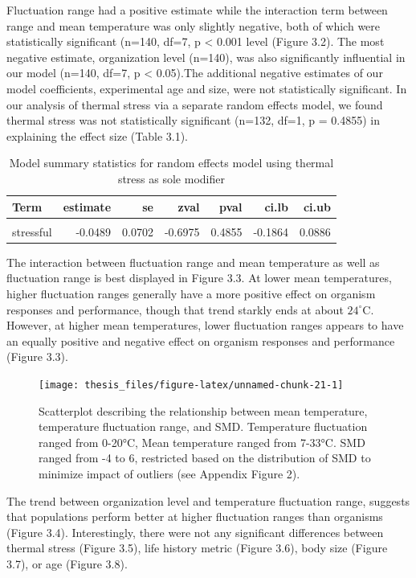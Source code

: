 \documentclass[12pt,twoside]{reedthesis}
\begin{document}
Fluctuation range had a positive estimate while the interaction term between range and mean temperature was only slightly negative, both of which were statistically significant (n=140, df=7, p \textless{} 0.001 level (Figure 3.2). The most negative estimate, organization level (n=140), was also significantly influential in our model (n=140, df=7, p \textless{} 0.05).The additional negative estimates of our model coefficients, experimental age and size, were not statistically significant. In our analysis of thermal stress via a separate random effects model, we found thermal stress was not statistically significant (n=132, df=1, p = 0.4855) in
explaining the effect size (Table 3.1).
\begin{table}[!h]

\caption[Thermal stress model summary statistics]{\label{tab:unnamed-chunk-20}Model summary statistics for random effects model using thermal stress as sole modifier}
\centering
\begin{tabular}[t]{lrrrrrr}
\toprule
\textbf{Term} & \textbf{estimate} & \textbf{se} & \textbf{zval} & \textbf{pval} & \textbf{ci.lb} & \textbf{ci.ub}\\
\midrule
\cellcolor{gray!6}{intercept} & \cellcolor{gray!6}{0.2050} & \cellcolor{gray!6}{0.1846} & \cellcolor{gray!6}{1.1104} & \cellcolor{gray!6}{0.2668} & \cellcolor{gray!6}{-0.1568} & \cellcolor{gray!6}{0.5669}\\
stressful & -0.0489 & 0.0702 & -0.6975 & 0.4855 & -0.1864 & 0.0886\\
\bottomrule
\end{tabular}
\end{table}
\clearpage

The interaction between fluctuation range and mean temperature as well as fluctuation range is best displayed in Figure 3.3. At lower mean temperatures, higher fluctuation ranges generally have a more positive effect on organism responses and performance, though that trend starkly ends at about \(24^{\circ}\)C. However, at higher mean temperatures, lower fluctuation ranges appears to have an equally positive and negative effect on organism responses and performance (Figure 3.3).
\begin{figure}

{\centering \texttt{[image: thesis\_files/figure-latex/unnamed-chunk-21-1]} 

}

\caption[Scatterplot of relationship between range, mean, and SMD]{Scatterplot describing the relationship between mean temperature, temperature fluctuation range, and SMD. Temperature fluctuation ranged from 0-20°C, Mean temperature ranged from 7-33°C. SMD ranged from -4 to 6, restricted based on the distribution of SMD to minimize impact of outliers (see Appendix Figure 2).}\label{fig:unnamed-chunk-21}
\end{figure}
The trend between organization level and temperature fluctuation range, suggests that populations perform better at higher fluctuation ranges than organisms (Figure 3.4). Interestingly, there were not any significant differences between thermal stress (Figure 3.5), life history metric (Figure 3.6), body size (Figure 3.7), or age (Figure 3.8).
\end{document}
